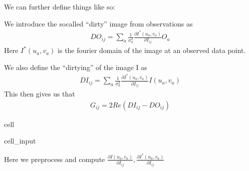 \documentclass[letterpaper,10pt,english]{jupyterBook}
\begin{document}
\sphinxAtStartPar
We can further define things like so:

\sphinxAtStartPar
We introduce the so\sphinxhyphen{}called “dirty” image from observations as
\begin{equation*}
\begin{split}DO_{ij} = \sum_a \frac{1}{\sigma^2_a}\frac{\partial I^*(u_a,v_a)}{\partial I_{ij}}O_a\end{split}
\end{equation*}
\sphinxAtStartPar
Here \(I^*(u_a,v_a)\) is the fourier domain of the image at an observed data point.

\sphinxAtStartPar
We also define the “dirtying” of the image I as
\begin{equation*}
\begin{split}DI_{ij} = \sum_a \frac{1}{\sigma^2_a}\frac{\partial I^*(u_a,v_a)}{\partial I_{ij}}I(u_a,v_a)\end{split}
\end{equation*}
\sphinxAtStartPar
This then gives us that
\begin{equation*}
\begin{split}G_{ij} = 2Re(DI_{ij}-DO_{ij})\end{split}
\end{equation*}
\begin{sphinxuseclass}{cell}\begin{sphinxVerbatimInput}

\begin{sphinxuseclass}{cell_input}
\begin{sphinxVerbatim}[commandchars=\\\{\}]
   
   
  
\end{sphinxVerbatim}

\end{sphinxuseclass}\end{sphinxVerbatimInput}

\end{sphinxuseclass}
\sphinxAtStartPar
Here we preprocess and compute \(\frac{\partial I(u_a,v_a)}{\partial I_{ij}}, \frac{\partial I^*(u_a,v_a)}{\partial I_{ij}}\)
\end{document}
